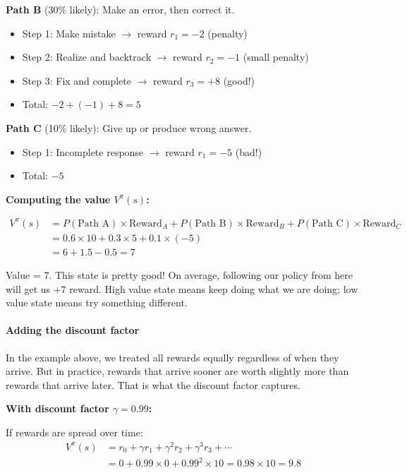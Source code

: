 \begin{chapterenv}
\textbf{Path B} (30\% likely): Make an error, then correct it.
\begin{itemize}[nosep]
    \item Step 1: Make mistake $\to$ reward $r_1 = -2$ (penalty)
    \item Step 2: Realize and backtrack $\to$ reward $r_2 = -1$ (small penalty)
    \item Step 3: Fix and complete $\to$ reward $r_3 = +8$ (good!)
    \item Total: $-2 + (-1) + 8 = 5$
\end{itemize}

\textbf{Path C} (10\% likely): Give up or produce wrong answer.
\begin{itemize}[nosep]
    \item Step 1: Incomplete response $\to$ reward $r_1 = -5$ (bad!)
    \item Total: $-5$
\end{itemize}

\textbf{Computing the value $V^\pi(s)$:}

\begin{align*}
V^\pi(s) &= P(\text{Path A}) \times \text{Reward}_A + P(\text{Path B}) \times \text{Reward}_B + P(\text{Path C}) \times \text{Reward}_C \\
&= 0.6 \times 10 + 0.3 \times 5 + 0.1 \times (-5) \\
&= 6 + 1.5 - 0.5 = 7
\end{align*}

\begin{tipbox}
Value = 7. This state is pretty good! On average, following our policy from here will get us +7 reward. High value state means keep doing what we are doing; low value state means try something different.
\end{tipbox}

\paragraph{Adding the discount factor}

In the example above, we treated all rewards equally regardless of when they arrive. But in practice, rewards that arrive sooner are worth slightly more than rewards that arrive later. That is what the discount factor captures.

\textbf{With discount factor $\gamma = 0.99$:}

If rewards are spread over time:
\begin{align*}
V^\pi(s) &= r_0 + \gamma r_1 + \gamma^2 r_2 + \gamma^3 r_3 + \cdots \\
&= 0 + 0.99 \times 0 + 0.99^2 \times 10 = 0.98 \times 10 = 9.8
\end{align*}


\end{chapterenv}
